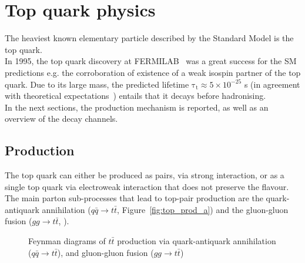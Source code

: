 \section{Top quark physics}
The heaviest known elementary particle described by the Standard Model is the top quark.\\
In 1995, the top quark discovery at FERMILAB~\cite{CDF,D0} was a great success for the SM predictions e.g. the corroboration of existence  of a weak isospin partner of the top quark.
Due to its large mass, the predicted lifetime $\mathrm{\tau_{t} \approx 5\times 10^{−25}}$ s (in agreement with theoretical expectations~\cite{LHcb_top}) entails that it decays before hadronising.\\
In the next sections, the production mechanism is reported, as well as an overview of the decay channels.
\subsection{Production}
The top quark can either be produced as pairs, via strong interaction, or as a single top quark via electroweak interaction that does not preserve the flavour.\\
The main parton sub-processes that lead to top-pair production are the quark-antiquark annihilation ($q\bar{q}\rightarrow t\bar{t}$, Figure~\ref{fig:top_prod_a}) and the gluon-gluon fusion ($gg\rightarrow t\bar{t}$, ).\\
\begin{figure}[h]
	\centering
	\quad
	\quad
	\caption{Feynman diagrams of $t\bar{t}$ production via  quark-antiquark annihilation ($q\bar{q}\rightarrow t\bar{t}$),  and  gluon-gluon fusion ($gg\rightarrow t\bar{t}$) }
\end{figure}
